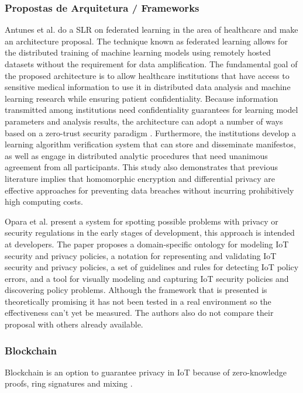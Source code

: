 \documentclass[conference]{IEEEtran}
\begin{document}
\subsubsection{Propostas de Arquitetura / Frameworks}

Antunes et al. \cite{AntunesFederated} do a SLR on federated learning in
the area of healthcare and make an architecture proposal. The technique
known as federated learning allows for the distributed training of machine
learning models using remotely hosted datasets without the requirement for
data amplification. The fundamental goal of the proposed architecture is
to allow healthcare institutions that have access to sensitive medical information
to use it in distributed data analysis and machine learning research while
ensuring patient confidentiality. Because information transmitted among
institutions need confidentiality guarantees for learning model parameters
and analysis results, the architecture can adopt a number of ways based on
a zero-trust security paradigm \cite{ChenSecurity}. Furthermore, the institutions
develop a learning algorithm verification system that can store and disseminate
manifestos, as well as engage in distributed analytic procedures that need
unanimous agreement from all participants. This study also demonstrates
that previous literature implies that homomorphic encryption and differential
privacy are effective approaches for preventing data breaches without incurring
prohibitively high computing costs.

Opara et al. \cite{opara2022framework} present a system for spotting possible
problems with privacy or security regulations in the early stages of development,
this approach is intended at developers. The paper proposes a domain-specific
ontology for modeling IoT security and privacy policies, a notation for
representing and validating IoT security and privacy policies, a set of
guidelines and rules for detecting IoT policy errors, and a tool for visually
modeling and capturing IoT security policies and discovering policy problems.
Although the framework that is presented is theoretically promising it has
not been tested in a real environment so the effectiveness can't yet be
measured. The authors also do not compare their proposal with others already
available.

\subsubsection{Blockchain}

Blockchain is an option to guarantee privacy in IoT because of zero-knowledge
proofs, ring signatures and mixing \cite{PrivacyblockchainWikipedia}.
\end{document}
